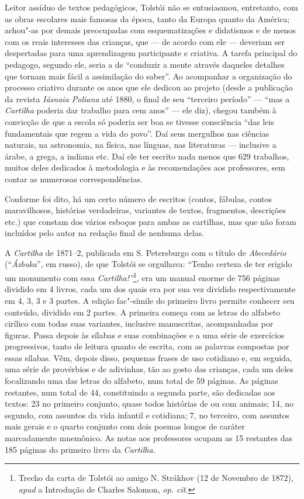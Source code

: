 {{Leitor assíduo de textos pedagógicos, Tolstói não se entusiasmou,
entretanto, com as obras escolares mais famosas da época, tanto da
Europa quanto da América; achou"-as por demais preocupadas com
esquematizações e didatismos e de menos com os reais interesses das
crianças, que --- de acordo com ele --- deveriam ser despertadas para uma
aprendizagem participante e criativa. A tarefa principal do pedagogo,
segundo ele, seria a de ``conduzir a mente através daqueles detalhes que
tornam mais fácil a assimilação do saber''. Ao acompanhar a organização
do processo criativo durante os anos que ele dedicou ao projeto (desde a
publicação da revista \emph{Iásnaia Poliana} até 1880, o final de seu
``terceiro período'' --- ``mas a \emph{Cartilha} poderia dar trabalho para
cem anos'' --- ele diz), chegou também à convicção de que a escola só
poderia ser boa se tivesse consciência ``das leis fundamentais que regem
a vida do povo''. Daí seus mergulhos nas ciências naturais, na
astronomia, na física, nas línguas, nas literaturas --- inclusive a árabe,
a grega, a indiana etc. Daí ele ter escrito nada menos que 629
trabalhos, muitos deles dedicados à metodologia e às recomendações aos
professores, sem contar as numerosas correspondências. 

Conforme foi dito, há um certo número de escritos (contos, fábulas,
contos maravilhosos, histórias verdadeiras, variantes de textos,
fragmentos, descrições etc.) que constam dos vários esboços para ambas
as cartilhas, mas que não foram incluídos pelo autor na redação final de
nenhuma delas.

A \emph{Cartilha} de 1871--2, publicada em S. Petersburgo com o título
de \emph{Abecedário} (``\emph{Ázbuka}'', em russo), de que Tolstói se
orgulhava: ``Tenho certeza de ter erigido um monumento com
essa \emph{Cartilha!''}\footnote{Trecho da carta de Tolstói ao amigo
  N. Strákhov (12 de Novembro de 1872), \emph{apud} a Introdução de
  Charles Salomon, \emph{op. cit.}}, era um manual enorme de 756 páginas
dividido em 4 livros, cada um dos quais era por sua vez dividido
respectivamente em 4, 3, 3 e 3 partes. A edição fac"-símile do primeiro
livro permite conhecer seu conteúdo, dividido em 2 partes. A primeira
começa com as letras do alfabeto cirílico com todas suas variantes,
inclusive manuscritas, acompanhadas por figuras. Passa depois às sílabas
e suas combinações e a uma série de exercícios progressivos, tanto de
leitura quanto de escrita, com as palavras compostas por essas sílabas.
Vêm, depois disso, pequenas frases de uso cotidiano e, em seguida, uma
série de provérbios e de adivinhas, tão ao gosto das crianças, cada um
deles focalizando uma das letras do alfabeto, num total de 59 páginas.
As páginas restantes, num total de 44, constituindo a segunda parte, são
dedicadas aos textos: 23 no primeiro conjunto, quase todos histórias de
ou com animais; 14, no segundo, com assuntos da vida infantil e
cotidiana; 7, no terceiro, com assuntos mais gerais e o quarto conjunto
com dois poemas longos de caráter marcadamente mnemônico. As notas aos
professores ocupam as 15 restantes das 185 páginas do primeiro livro
da \emph{Cartilha.}

}}

